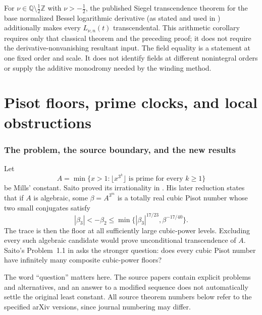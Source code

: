 \documentclass[11pt,a4paper]{article}
\theoremstyle{definition}\newtheorem{definition}[theorem]{Definition}
\theoremstyle{remark}\newtheorem{remark}[theorem]{Remark}
\begin{document}
For $\nu\in\mathbb Q\setminus\tfrac12\mathbb Z$ with $\nu>-\tfrac12$, the published
Siegel transcendence theorem for the base normalized Bessel logarithmic
derivative (as stated and used in \cite{LM95}) additionally makes every
$L_{\nu,n}(t)$ transcendental.
This arithmetic corollary requires only that classical theorem and
the preceding proof; it does not require the derivative-nonvanishing
resultant input.  The field equality is a statement at one fixed order
and scale.  It does not identify fields at different nonintegral orders
or supply the additive monodromy needed by the winding method.


\clearpage
\part{Pisot floors, prime clocks, and local obstructions}
\section{The problem, the source boundary, and the new results}
Let
\[
 A=\min\{x>1:\lfloor x^{3^k}\rfloor\text{ is prime for every }k\ge1\}
\]
be Mills' constant. Saito proved its irrationality in
\cite{SaitoIrrational}. His later reduction \cite[Theorem~1.7]{SaitoVariants} states that if $A$ is
algebraic, some $\beta=A^{3^m}$ is a totally real cubic Pisot number
whose two small conjugates satisfy
\begin{equation}\label{pis:eq:saitobounds}
 |\beta_3|<-\beta_2\le
 \min\{|\beta_3|^{17/23},\beta^{-17/40}\}.
\end{equation}
The trace is then the floor at all sufficiently large cubic-power
levels. Excluding every such algebraic candidate would prove
unconditional transcendence of $A$. Saito's Problem~1.1 in
\cite{SaitoIntervals} asks the stronger question: does every cubic
Pisot number have infinitely many composite cubic-power floors?

The word ``question'' matters here. The source papers contain
explicit problems and alternatives, and an answer to a modified
sequence does not automatically settle the original least constant.
All source theorem numbers below refer to the specified arXiv
versions, since journal numbering may differ.
\end{document}
